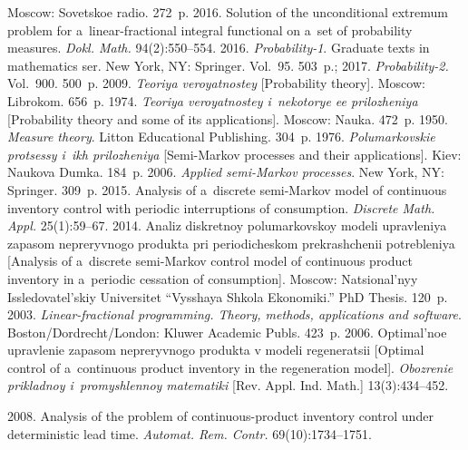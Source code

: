 \begin{multicols}{2}
{{\begin{thebibliography}{99}
Moscow: Sovetskoe radio. 272~p.
 2016. Solution of the unconditional extremum problem for 
a~linear-fractional 
integral functional on a~set of probability measures. 
\textit{Dokl. Math.} 94(2):550--554.
 2016. 
\textit{Probability-1}. Graduate texts in mathematics ser.
New York, NY: Springer. Vol.~95. 503~p.;
2017. \textit{Probability-2.} Vol.~900. 500~p.
 2009. 
\textit{Teoriya veroyatnostey} [Probability theory]. Moscow: Librokom. 656~p.
 1974. 
\textit{Teoriya veroyatnostey i~nekotorye ee prilozheniya} 
[Probability theory and some of its applications]. Moscow: Nauka. 472~p.
 1950. \textit{Measure theory}. Litton Educational Publishing. 304~p.
 1976. 
\textit{Polumarkovskie protsessy i~ikh prilozheniya} 
[Semi-Markov processes and their applications]. Kiev: Naukova Dumka. 184~p.
 2006. 
\textit{Applied semi-Markov processes}. New York, NY: Springer. 309~p.
 2015. Analysis of a~discrete semi-Markov model of continuous inventory 
control with periodic interruptions of consumption. 
\textit{Discrete Math. \mbox{Appl}.} 25(1):59--67.
 2014. Analiz diskretnoy polumarkovskoy modeli upravleniya 
zapasom nepreryvnogo produkta pri periodicheskom prekrashchenii potrebleniya 
[Analysis of a~discrete semi-Markov control model of continuous product inventory 
in a~periodic cessation of consumption].  
Moscow: Natsional'nyy Issledovatel'skiy Universitet ``Vysshaya Shkola Ekonomiki.'' 
PhD Thesis. 120~p.
 2003. 
\textit{Linear-fractional programming. Theory, methods, applications and software}. 
Boston/\linebreak Dordrecht/London: Kluwer Academic Publs. 423~p.
 2006. Optimal'noe upravlenie 
zapasom nepreryvnogo produkta v modeli regeneratsii [Optimal control of 
a~continuous product inventory in the regeneration model]. 
\textit{Obozrenie prikladnoy i~promyshlennoy matematiki} [Rev. Appl. Ind. Math.]
13(3):434--452.

 2008. 
Analysis of the problem of continuous-product inventory control under deterministic 
lead time. \textit{Automat. Rem. Contr.} 69(10):1734--1751.


\end{thebibliography}}}
\end{multicols}
